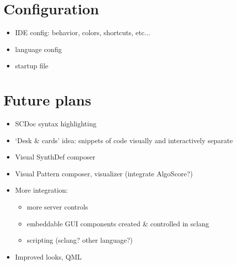 \documentclass[a4paper,10pt]{article}
\begin{document}
\section{Configuration}

\begin{itemize}
 \item IDE config: behavior, colors, shortcuts, etc...
 \item language config
 \item startup file
\end{itemize}


\section{Future plans}

\begin{itemize}
 \item SCDoc syntax highlighting
 \item `Desk \& cards' idea: snippets of code visually and interactively separate
 \item Visual SynthDef composer
 \item Visual Pattern composer, visualizer (integrate AlgoScore?)
 \item More integration:
 \begin{itemize}
    \item more server controls
    \item  embeddable GUI components created \& controlled in sclang
    \item  scripting (sclang? other language?)
 \end{itemize}
 \item Improved looks, QML
\end{itemize}
\end{document}
